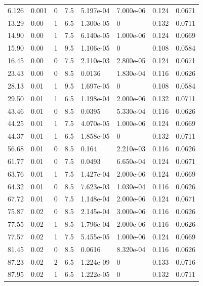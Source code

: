 \documentclass[preview]{standalone}
\begin{document}
{{\begin{tabular}{L{1.2cm}C{1.2cm} C{0.3cm}C{0.5cm} C{1.4cm}C{1.4cm} C{1.4cm}C{1.4cm}}
  6.126  &  0.001  & 0     & 7.5 &  5.197e-04  & 7.000e-06  & 0.124 &  0.0671   \\ 
  13.29  &  0.00  & 1     & 6.5 &  1.300e-05  & 0  & 0.132 &  0.0711   \\ 
  14.90  &  0.00  & 1     & 7.5 &  6.140e-05  & 1.000e-06  & 0.124 &  0.0669   \\ 
  15.90  &  0.00  & 1     & 9.5 &  1.106e-05  & 0  & 0.108 &  0.0584   \\ 
  16.45  &  0.00  & 0     & 7.5 &  2.110e-03  & 2.800e-05  & 0.124 &  0.0671   \\ 
  23.43  &  0.00  & 0     & 8.5 &  0.0136  & 1.830e-04  & 0.116 &  0.0626   \\ 
  28.13  &  0.01  & 1     & 9.5 &  1.697e-05  & 0  & 0.108 &  0.0584   \\ 
  29.50  &  0.01  & 1     & 6.5 &  1.198e-04  & 2.000e-06  & 0.132 &  0.0711   \\ 
  43.46  &  0.01  & 0     & 8.5 &  0.0395  & 5.330e-04  & 0.116 &  0.0626   \\ 
  44.25  &  0.01  & 1     & 7.5 &  4.070e-05  & 1.000e-06  & 0.124 &  0.0669   \\ 
  44.37  &  0.01  & 1     & 6.5 &  1.858e-05  & 0  & 0.132 &  0.0711   \\ 
  56.68  &  0.01  & 0     & 8.5 &  0.164  & 2.210e-03  & 0.116 &  0.0626   \\ 
  61.77  &  0.01  & 0     & 7.5 &  0.0493  & 6.650e-04  & 0.124 &  0.0671   \\ 
  63.76  &  0.01  & 1     & 7.5 &  1.427e-04  & 2.000e-06  & 0.124 &  0.0669   \\ 
  64.32  &  0.01  & 0     & 8.5 &  7.623e-03  & 1.030e-04  & 0.116 &  0.0626   \\ 
  67.72  &  0.01  & 0     & 7.5 &  1.148e-04  & 2.000e-06  & 0.124 &  0.0671   \\ 
  75.87  &  0.02  & 0     & 8.5 &  2.145e-04  & 3.000e-06  & 0.116 &  0.0626   \\ 
  77.55  &  0.02  & 1     & 8.5 &  1.796e-04  & 2.000e-06  & 0.116 &  0.0626   \\ 
  77.57  &  0.02  & 1     & 7.5 &  5.455e-05  & 1.000e-06  & 0.124 &  0.0669   \\ 
  81.45  &  0.02  & 0     & 8.5 &  0.0616  & 8.320e-04  & 0.116 &  0.0626   \\ 
  87.23  &  0.02  & 2     & 6.5 &  1.224e-09  & 0  & 0.133 &  0.0716   \\ 
  87.95  &  0.02  & 1     & 6.5 &  1.222e-05  & 0  & 0.132 &  0.0711   \\ 

\end{tabular}}}
\end{document}
